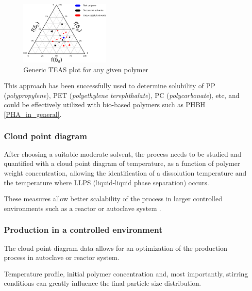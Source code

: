 \documentclass{article}
\begin{document}
    \begin{figure}[h!]
        \centering
        \includegraphics[width=0.4\textwidth]{Pictures/TEAS_plot.eps}
        \caption{Generic TEAS plot for any given polymer \autocites{DechetMaximilianA2020OtDo}{Inkscape}}
        \label{fig:TEAS_plot}
    \end{figure}


    This approach has been successfully used to determine solubility of PP (\textit{polypropylene}), PET (\textit{polyethylene terephthalate}), 
    PC (\textit{polycarbonate}), etc, and could be effectively utilized with bio-based polymers such as PHBH \ref{PHA_in_general}.
    
    

    \subsubsection{Cloud point diagram \label{Cloud_point_diagram}}

    After choosing a suitable moderate solvent, the process needs to be studied and quantified 
    with a cloud point diagram of temperature, as a function of polymer weight concentration, allowing the identification of a dissolution 
    temperature and the temperature where LLPS (liquid-liquid phase separation) occurs. 
    
    These measures allow better scalability of the process in larger controlled environments such as a reactor or autoclave system \autocite{DechetMaximilianA2020OtDo}.
    
    \subsubsection{Production in a controlled environment \label{precipitation_production_controlled_environment}}

    The cloud point diagram data allows for an optimization of the production process in autoclave or reactor system. 

    Temperature profile, initial polymer concentration and, most importantly, stirring conditions can greatly influence the final 
    particle size distribution. 
    
\end{document}
